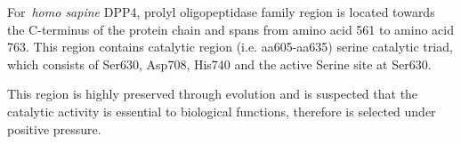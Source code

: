 For~\textit{homo sapine} DPP4, prolyl oligopeptidase family region is located towards the C-terminus of the protein chain and spans from amino acid 561 to amino acid 763. This region contains catalytic region (i.e. aa605-aa635) serine catalytic triad, which consists of Ser630, Asp708, His740 and the active Serine site at Ser630. \par
This region is highly preserved through evolution and is suspected that the catalytic activity is essential to biological functions, therefore is selected under positive pressure. 